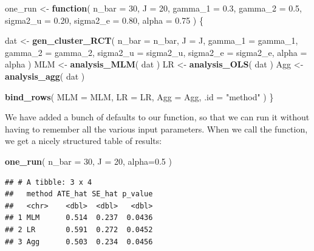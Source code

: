 \documentclass[
]{book}
\newenvironment{Shaded}{\begin{snugshade}}{\end{snugshade}}
\newcommand{\AttributeTok}[1]{\textcolor[rgb]{0.13,0.29,0.53}{#1}}
\newcommand{\ControlFlowTok}[1]{\textcolor[rgb]{0.13,0.29,0.53}{\textbf{#1}}}
\newcommand{\DecValTok}[1]{\textcolor[rgb]{0.00,0.00,0.81}{#1}}
\newcommand{\FloatTok}[1]{\textcolor[rgb]{0.00,0.00,0.81}{#1}}
\newcommand{\FunctionTok}[1]{\textcolor[rgb]{0.13,0.29,0.53}{\textbf{#1}}}
\newcommand{\NormalTok}[1]{#1}
\newcommand{\OtherTok}[1]{\textcolor[rgb]{0.56,0.35,0.01}{#1}}
\newcommand{\StringTok}[1]{\textcolor[rgb]{0.31,0.60,0.02}{#1}}
\begin{document}
\begin{Shaded}
\begin{Highlighting}[]
\NormalTok{one\_run }\OtherTok{\textless{}{-}} \ControlFlowTok{function}\NormalTok{( }
  \AttributeTok{n\_bar =} \DecValTok{30}\NormalTok{, }\AttributeTok{J =} \DecValTok{20}\NormalTok{, }\AttributeTok{gamma\_1 =} \FloatTok{0.3}\NormalTok{, }\AttributeTok{gamma\_2 =} \FloatTok{0.5}\NormalTok{,}
  \AttributeTok{sigma2\_u =} \FloatTok{0.20}\NormalTok{, }\AttributeTok{sigma2\_e =} \FloatTok{0.80}\NormalTok{, }\AttributeTok{alpha =} \FloatTok{0.75} 
\NormalTok{) \{}
  
\NormalTok{  dat }\OtherTok{\textless{}{-}} \FunctionTok{gen\_cluster\_RCT}\NormalTok{(}
    \AttributeTok{n\_bar =}\NormalTok{ n\_bar, }\AttributeTok{J =}\NormalTok{ J, }\AttributeTok{gamma\_1 =}\NormalTok{ gamma\_1, }\AttributeTok{gamma\_2 =}\NormalTok{ gamma\_2,}
    \AttributeTok{sigma2\_u =}\NormalTok{ sigma2\_u, }\AttributeTok{sigma2\_e =}\NormalTok{ sigma2\_e, }\AttributeTok{alpha =}\NormalTok{ alpha }
\NormalTok{  )}
\NormalTok{  MLM }\OtherTok{\textless{}{-}} \FunctionTok{analysis\_MLM}\NormalTok{( dat )}
\NormalTok{  LR }\OtherTok{\textless{}{-}} \FunctionTok{analysis\_OLS}\NormalTok{( dat )}
\NormalTok{  Agg }\OtherTok{\textless{}{-}} \FunctionTok{analysis\_agg}\NormalTok{( dat )}
  
  \FunctionTok{bind\_rows}\NormalTok{( }\AttributeTok{MLM =}\NormalTok{ MLM, }\AttributeTok{LR =}\NormalTok{ LR, }\AttributeTok{Agg =}\NormalTok{ Agg, }\AttributeTok{.id =} \StringTok{"method"}\NormalTok{ )}
\NormalTok{\}}
\end{Highlighting}
\end{Shaded}

We have added a bunch of defaults to our function, so that we can run it without having to remember all the various input parameters.
When we call the function, we get a nicely structured table of results:

\begin{Shaded}
\begin{Highlighting}[]
\FunctionTok{one\_run}\NormalTok{( }\AttributeTok{n\_bar =} \DecValTok{30}\NormalTok{, }\AttributeTok{J =} \DecValTok{20}\NormalTok{, }\AttributeTok{alpha=}\FloatTok{0.5}\NormalTok{ )}
\end{Highlighting}
\end{Shaded}

\begin{verbatim}
## # A tibble: 3 x 4
##   method ATE_hat SE_hat p_value
##   <chr>    <dbl>  <dbl>   <dbl>
## 1 MLM      0.514  0.237  0.0436
## 2 LR       0.591  0.272  0.0452
## 3 Agg      0.503  0.234  0.0456
\end{verbatim}
\end{document}
